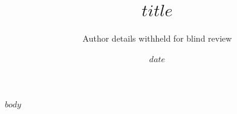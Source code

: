 \documentclass[12pt,a4paper]{article}
\title{$title$}
\author{Author details withheld for blind review}
\date{$date$}
\begin{document}
\maketitle

$body$
\end{document}
